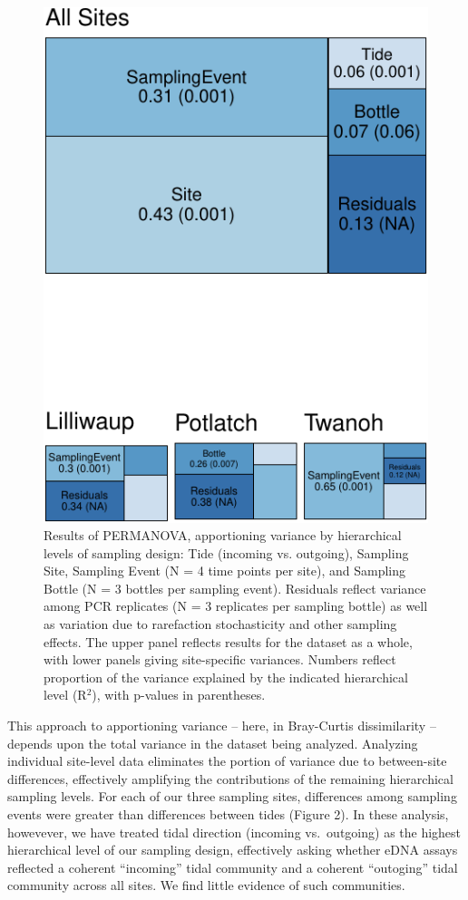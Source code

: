 \documentclass[fleqn,10pt,lineno]{wlpeerj} %
\begin{document}
\begin{figure}

{\centering \includegraphics{figures/ADONIS_TreemapDiagrams-1} 

}

\caption{\label{fig:AdonisFigure}Results of PERMANOVA, apportioning variance by hierarchical levels of sampling design: Tide (incoming vs. outgoing), Sampling Site, Sampling Event (N = 4 time points per site), and Sampling Bottle (N = 3 bottles per sampling event). Residuals reflect variance among PCR replicates (N = 3 replicates per sampling bottle) as well as variation due to rarefaction stochasticity and other sampling effects. The upper panel reflects results for the dataset as a whole, with lower panels giving site-specific variances. Numbers reflect proportion of the variance explained by the indicated hierarchical level (R$^2$), with p-values in parentheses.}\label{fig:ADONIS_TreemapDiagrams}
\end{figure}

This approach to apportioning variance -- here, in Bray-Curtis
dissimilarity -- depends upon the total variance in the dataset being
analyzed. Analyzing individual site-level data eliminates the portion of
variance due to between-site differences, effectively amplifying the
contributions of the remaining hierarchical sampling levels. For each of
our three sampling sites, differences among sampling events were greater
than differences between tides (Figure 2). In these analysis, howevever,
we have treated tidal direction (incoming vs.~outgoing) as the highest
hierarchical level of our sampling design, effectively asking whether
eDNA assays reflected a coherent ``incoming'' tidal community and a
coherent ``outoging'' tidal community across all sites. We find little
evidence of such communities.
\end{document}
